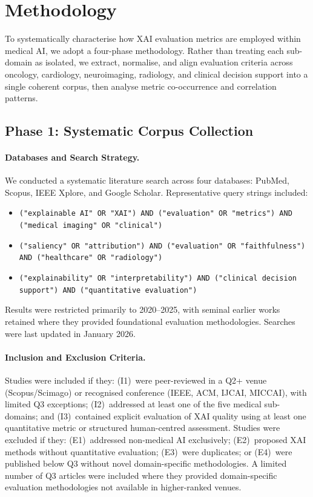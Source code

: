 \section{Methodology}

To systematically characterise how XAI evaluation metrics are employed within medical AI, we adopt a four-phase methodology. Rather than treating each sub-domain as isolated, we extract, normalise, and align evaluation criteria across oncology, cardiology, neuroimaging, radiology, and clinical decision support into a single coherent corpus, then analyse metric co-occurrence and correlation patterns.

\subsection{Phase 1: Systematic Corpus Collection}

\paragraph{Databases and Search Strategy.}
We conducted a systematic literature search across four databases: PubMed, Scopus, IEEE Xplore, and Google Scholar. Representative query strings included:
\begin{itemize}
    \item \texttt{("explainable AI" OR "XAI") AND ("evaluation" OR "metrics") AND ("medical imaging" OR "clinical")}
    \item \texttt{("saliency" OR "attribution") AND ("evaluation" OR "faithfulness") AND ("healthcare" OR "radiology")}
    \item \texttt{("explainability" OR "interpretability") AND ("clinical decision support") AND ("quantitative evaluation")}
\end{itemize}
Results were restricted primarily to 2020--2025, with seminal earlier works retained where they provided foundational evaluation methodologies. Searches were last updated in January 2026.

\paragraph{Inclusion and Exclusion Criteria.}
Studies were included if they: (I1)~were peer-reviewed in a Q2+ venue (Scopus/Scimago) or recognised conference (IEEE, ACM, IJCAI, MICCAI), with limited Q3 exceptions; (I2)~addressed at least one of the five medical sub-domains; and (I3)~contained explicit evaluation of XAI quality using at least one quantitative metric or structured human-centred assessment.
Studies were excluded if they: (E1)~addressed non-medical AI exclusively; (E2)~proposed XAI methods without quantitative evaluation; (E3)~were duplicates; or (E4)~were published below Q3 without novel domain-specific methodologies. A limited number of Q3 articles were included where they provided domain-specific evaluation methodologies not available in higher-ranked venues.

